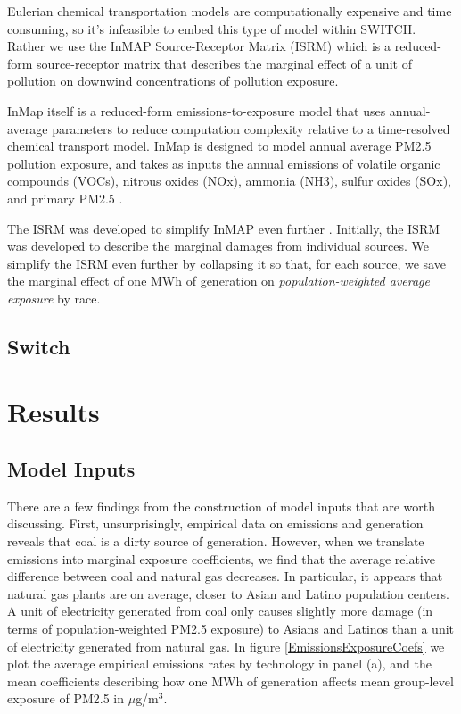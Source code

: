 \documentclass[a4paper]{article}
\theoremstyle{definition}
\theoremstyle{plain}
\begin{document}
Eulerian chemical transportation models are computationally expensive and time consuming, so it's infeasible to embed this type of model within SWITCH.  Rather we use the InMAP Source-Receptor Matrix (ISRM) which is a reduced-form source-receptor matrix that describes the marginal effect of a unit of pollution on downwind concentrations of pollution exposure.

InMap itself is a reduced-form emissions-to-exposure model that uses annual-average parameters to reduce computation complexity relative to a time-resolved chemical transport model. InMap is designed to model annual average PM2.5 pollution exposure, and takes as inputs the annual emissions of volatile organic compounds (VOCs), nitrous oxides (NOx), ammonia (NH3), sulfur oxides (SOx), and primary PM2.5 \citep{Tessum2017InMAP:Interventions}.

The ISRM was developed to simplify InMAP even further \citep{Goodkind2019Fine-scaleEmissions}.  Initially, the ISRM was developed to describe the marginal damages from individual sources.  We simplify the ISRM even further by collapsing it so that, for each source, we save the marginal effect of one MWh of generation on \textit{population-weighted average exposure} by race.

\subsection{Switch}

\section{Results}
\subsection{Model Inputs}
There are a few findings from the construction of model inputs that are worth discussing. First, unsurprisingly, empirical data on emissions and generation reveals that coal is a dirty source of generation. However, when we translate emissions into marginal exposure coefficients, we find that the average relative difference between coal and natural gas decreases. In particular, it appears that natural gas plants are on average, closer to Asian and Latino population centers. A unit of electricity generated from coal only causes slightly more damage (in terms of population-weighted PM2.5 exposure) to Asians and Latinos than a unit of electricity generated from natural gas. In figure \ref{EmissionsExposureCoefs} we plot the average empirical emissions rates by technology in panel (a), and the mean coefficients describing how one MWh of generation affects mean group-level exposure of PM2.5 in $\mu$g/m$^3$. 
\end{document}
